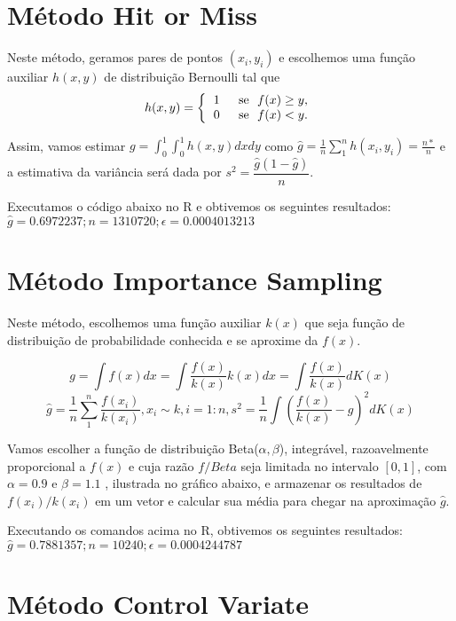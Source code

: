 \documentclass{article}
\begin{document}
\section{Método Hit or Miss}

Neste método, geramos pares de pontos $(x_i,y_i)$ e escolhemos uma função auxiliar $h(x,y)$ de distribuição Bernoulli tal que 
\[
  h(x,y)= \left\{
    \begin{tabular}[]{cc}
     1 & \text{ se } $f(x) \geq y$,\\
     0 & \text{ se } $f(x) < y$.
    \end{tabular}
    \right.
  \]
  
  
  Assim, vamos estimar $g=\int_{0}^{1}\int_{0}^{1}h(x,y)dxdy$ como $\hat{g}=\frac{1}{n}\sum_{1}^{n}h(x_i,y_i)=\frac{n*}{n}$ e a estimativa da variância será dada por $s^2 = \dfrac{\hat{g}(1-\hat{g})}{n}$.
  
  
  Executamos o código abaixo no R e obtivemos os seguintes resultados:\\

 $\hat{g} = 0.6972237; n = 1310720;    \epsilon = 0.0004013213$

\section{Método Importance Sampling}



Neste método, escolhemos uma função auxiliar $k(x)$ que seja função de distribuição de probabilidade conhecida e se aproxime da $f(x)$.

$$
g = \int f(x)dx = \int\frac{f(x)}{k(x)} k(x)dx = \int \frac{f(x)}{k(x)}dK(x)
$$
$$
\hat{g} = \frac{1}{n}\sum_{1}^{n}\frac{f(x_i)}{k(x_i)}, x_i \sim k, i =1:n,s^2 = \frac{1}{n}\int\left(\frac{f(x)}{k(x)} - \hat{g}\right)^2dK(x)
$$


Vamos escolher a função de distribuição Beta($\alpha,\beta$), integrável, razoavelmente proporcional a $f(x)$ e cuja razão $f/Beta$ seja limitada no intervalo $[0,1]$, com $\alpha = 0.9$ e $\beta=1.1$ , ilustrada no gráfico abaixo, e armazenar os resultados de $f(x_i)/k(x_i)$ em um vetor e calcular sua média para chegar na aproximação $\hat{g}$.

Executando os comandos acima no R, obtivemos os seguintes resultados:\\
$\hat{g} = 0.7881357; n = 10240;    \epsilon = 0.0004244787$

\section{Método Control Variate}
\end{document}
